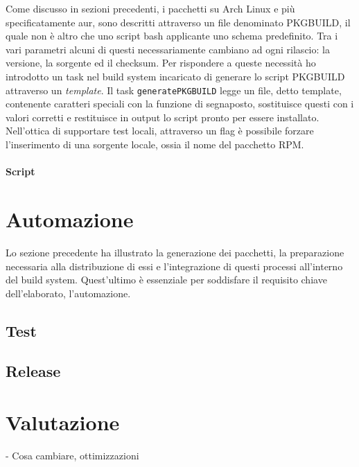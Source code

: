 Come discusso in sezioni precedenti, i pacchetti su Arch Linux e più specificatamente \ac{aur}, sono descritti attraverso un file denominato PKGBUILD, il quale non è altro che uno script bash applicante uno schema predefinito. Tra i vari parametri alcuni di questi necessariamente cambiano ad ogni rilascio: la versione, la sorgente ed il checksum. Per rispondere a queste necessità ho introdotto un task nel build system incaricato di generare lo script PKGBUILD attraverso un \textit{template}. Il task \texttt{generatePKGBUILD} legge un file, detto template, contenente caratteri speciali con la funzione di segnaposto, sostituisce questi con i valori corretti e restituisce in output lo script pronto per essere installato. Nell'ottica di supportare test locali, attraverso un flag è possibile forzare l'inserimento di una sorgente locale, ossia il nome del pacchetto RPM.

\paragraph{Script}

\section{Automazione}
Lo sezione precedente ha illustrato la generazione dei pacchetti, la preparazione necessaria alla distribuzione di essi e l'integrazione di questi processi all'interno del build system. Quest'ultimo è essenziale per soddisfare il requisito chiave dell'elaborato, l'automazione. 

\subsection{Test}

\subsection{Release}

\section{Valutazione}

- Cosa cambiare, ottimizzazioni